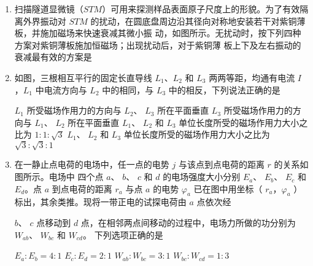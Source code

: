 \begin{enumerate}
\item
扫描隧道显微镜（$ STM $）可用来探测样品表面原子尺度上的形貌。为了有效隔离外界振动对 $ STM $
的扰动，在圆底盘周边沿其径向对称地安装若干对紫铜薄板，并施加磁场来快速衰减其微小振
动，如图所示。无扰动时，按下列四种方案对紫铜薄板施加恒磁场；出现扰动后，对于紫铜薄
板上下及左右振动的衰减最有效的方案是  
\begin{figure}[h!]
\centering

\end{figure}





\item
如图，三根相互平行的固定长直导线 $ L_{1} $、$ L_{2} $ 和 $ L_{3} $ 两两等距，均通有电流 $ I $ ，$ L_{1} $ 中电流方向与 $ L_{2} $
中的相同，与 $ L_{3} $ 中的相反，下列说法正确的是  
\begin{figure}[h!]
\centering

\end{figure}


\fourchoices
{$ L_{1} $ 所受磁场作用力的方向与 $ L_{2} $、 $ L_{3} $ 所在平面垂直}
{$ L_{3} $ 所受磁场作用力的方向与 $ L_{1} $、 $ L_{2} $ 所在平面垂直}
{$ L_{1} $、 $ L_{2} $ 和 $ L_{3} $ 单位长度所受的磁场作用力大小之比为 $ 1:1:\sqrt{3} $}
{$ L_{1} $、 $ L_{2} $ 和 $ L_{3} $ 单位长度所受的磁场作用力大小之比为 $ \sqrt{3}:\sqrt{3}:1 $}



\newpage
\item 
在一静止点电荷的电场中，任一点的电势 $ j $ 与该点到点电荷的距离 $ r $ 的关系如图所示。电场中
四个点 $ a $、 $ b $、 $ c $ 和 $ d $ 的电场强度大小分别 $ E_{a} $、 $ E_{b} $、 $ E_{c} $ 和 $ E_{d} $。点 $ a $ 到点电荷的距离 $ r_{a} $ 与点 $ a $
的电势 $\varphi_{a}$ 已在图中用坐标（ $ r_{a} $，$ \varphi_a $ ）标出，其余类推。现将一带正电的试探电荷由 $ a $ 点依次经

$ b $、 $ c $ 点移动到 $ d $ 点，在相邻两点间移动的过程中，电场力所做的功分别为 $ W_{ab} $、 $ W_{bc} $ 和 $ W_{cd} $。
下列选项正确的是  
\begin{figure}[h!]
\centering

\end{figure}


\fourchoices
{$ E_{a}: E_{b}=4: 1 $}
{$E_{c}: E_{d}=2: 1$}
{$W_{a b}: W_{b c}=3: 1$}
{$W_{b c}: W_{c d}=1: 3$}


\banswer{

}
\end{enumerate}

